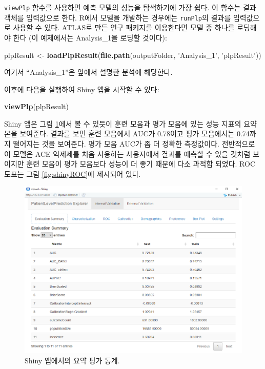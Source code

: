 \documentclass[10.5pt]{book}
\newenvironment{Shaded}{\begin{snugshade}}{\end{snugshade}}
\newcommand{\KeywordTok}[1]{\textcolor[rgb]{0.13,0.29,0.53}{\textbf{#1}}}
\newcommand{\StringTok}[1]{\textcolor[rgb]{0.31,0.60,0.02}{#1}}
\newcommand{\NormalTok}[1]{#1}
\theoremstyle{definition}
\theoremstyle{definition}
\theoremstyle{definition}
\theoremstyle{remark}
\begin{document}
\texttt{viewPlp} 함수를 사용하면 예측 모델의 성능을 탐색하기에 가장
쉽다. 이 함수는 결과 객체를 입력값으로 한다. R에서 모델을 개발하는
경우에는 \texttt{runPlp}의 결과를 입력값으로 사용할 수 있다. ATLAS로
만든 연구 패키지를 이용한다면 모델 중 하나를 로딩해야 한다 (이
예제에서는 Analysis\_1을 로딩할 것이다): 

\begin{Shaded}
\begin{Highlighting}[]
\NormalTok{plpResult <-}\StringTok{ }\KeywordTok{loadPlpResult}\NormalTok{(}\KeywordTok{file.path}\NormalTok{(outputFolder,}
                                     \StringTok{'Analysis_1'}\NormalTok{,}
                                     \StringTok{'plpResult'}\NormalTok{))}
\end{Highlighting}
\end{Shaded}

여기서 ``Analysis\_1''은 앞에서 설명한 분석에 해당한다.

이후에 다음을 실행하여 Shiny 앱을 시작할 수 있다:

\begin{Shaded}
\begin{Highlighting}[]
\KeywordTok{viewPlp}\NormalTok{(plpResult)}
\end{Highlighting}
\end{Shaded}

Shiny 앱은 그림 \ref{fig:shinySummary}에서 볼 수 있듯이 훈련 모음과 평가
모음에 있는 성능 지표의 요약본을 보여준다. 결과를 보면 훈련 모음에서
AUC가 0.78이고 평가 모음에서는 0.74까지 떨어지는 것을 보여준다. 평가
모음 AUC가 좀 더 정확한 측정값이다. 전반적으로 이 모델은 ACE 억제제를
처음 사용하는 사용자에서 결과를 예측할 수 있을 것처럼 보이지만 훈련
모음이 평가 모음보다 성능이 더 좋기 때문에 다소 과적합 되었다. ROC
도표는 그림 \ref{fig:shinyROC}에 제시되어 있다.

\begin{figure}
\includegraphics[width=1\linewidth]{images/PatientLevelPrediction/shinysummary} \caption{Shiny 앱에서의 요약 평가 통계.}\label{fig:shinySummary}
\end{figure}
\end{document}
